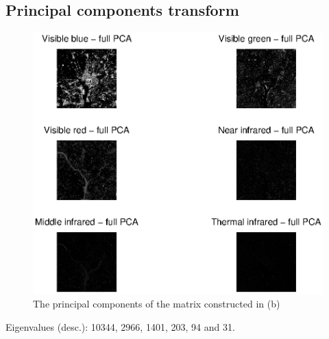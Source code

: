 \subsection{Principal components transform}
\begin{figure}[htb]
 \centering
 \includegraphics[width=\linewidth]{full_pca.eps}
 \caption{The principal components of the matrix constructed in (b)}
 \label{fig:full_pca}
\end{figure}
Eigenvalues (desc.): 10344, 2966, 1401, 203, 94 and 31.
\clearpage
